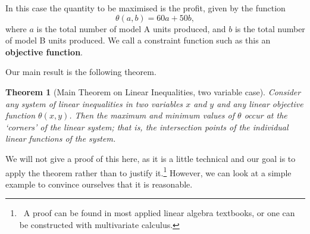 \documentclass[a4paper,leqno]{article}
\numberwithin{equation}{section}
\newtheorem{thm}[equation]{Theorem}
\theoremstyle{definition}
\theoremstyle{remark}
\newcommand{\df}[1]{\textbf{#1}}
\begin{document}
In this case the quantity to be maximised is the profit, given by the function
\begin{equation}
  \theta(a,b) = 60a + 50b,
\end{equation}
where $ a $ is the total number of model A units produced, and $ b $ is the total number of model B units produced. We call a constraint function
such as this an \df{objective function}.

Our main result is the following theorem.
\begin{thm}[Main Theorem on Linear Inequalities, two variable case]
  Consider any system of linear inequalities in two variables $ x $ and $ y $ and any linear objective function $ \theta(x,y) $. Then the maximum
  and minimum values of $ \theta $ occur at the `corners' of the linear system; that is, the intersection points of the individual linear functions
  of the system.
\end{thm}
We will not give a proof of this here, as it is a little technical and our goal is to apply the theorem rather than to justify it.\footnote{~A proof
can be found in most applied linear algebra textbooks, or one can be constructed with multivariate calculus.} However, we can look at a simple example
to convince ourselves that it is reasonable.
\end{document}
